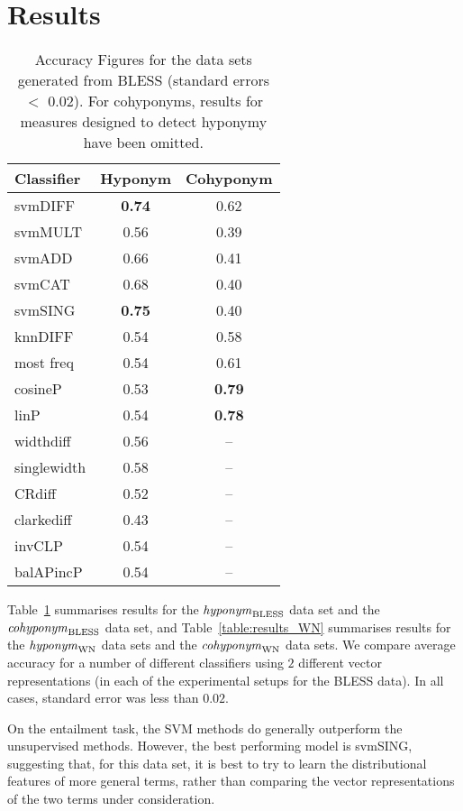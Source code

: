 \documentclass[11pt]{article}
\newcommand\entBLESS{\mbox{\em hyponym\/}_{\mbox{\scriptsize BLESS}}}
\newcommand\coordBLESS{\mbox{\em cohyponym\/}_{\mbox{\scriptsize BLESS}}}
\newcommand\entWN{\mbox{\em hyponym\/}_{\mbox{\scriptsize WN}}}
\newcommand\coordWN{\mbox{\em cohyponym\/}_{\mbox{\scriptsize WN}}}
\begin{document}
\section{Results}
\label{sect:results}

\begin{table}[ht]
\centering
\begin{tabular}{|l|c|c|}
\hline
Classifier&Hyponym&Cohyponym\\
\hline
svmDIFF&\textbf{0.74}&0.62\\
svmMULT&0.56&0.39\\
svmADD&0.66&0.41\\
svmCAT&0.68&0.40\\
svmSING&\textbf{0.75}&0.40\\
knnDIFF&0.54&0.58\\
\hline
most freq&0.54&0.61\\
cosineP&0.53&\textbf{0.79}\\
linP&0.54&\textbf{0.78}\\
widthdiff&0.56&--\\
singlewidth&0.58&--\\
CRdiff&0.52&--\\
clarkediff&0.43&--\\
invCLP&0.54&--\\
balAPincP&0.54&--\\
\hline
\end{tabular}
\caption{Accuracy Figures for the data sets generated from BLESS
  (standard errors $<$ 0.02). For cohyponyms, results for measures
  designed to detect hyponymy have been omitted.}
\label{table:results_ent}
\end{table}


Table~\ref{table:results_ent} summarises results for the $\entBLESS$ data set and the $\coordBLESS$ data set, and Table~\ref{table:results_WN} summarises results for the $\entWN$ data sets and the $\coordWN$ data sets.  We compare average accuracy for a number of different classifiers using $2$ different vector representations (in each of the experimental setups for the BLESS data).  In all cases, standard error was less than $0.02$.

On the entailment task, the SVM methods do generally outperform the unsupervised methods.  However, the best performing model is svmSING, suggesting that, for this data set, it is best to try to learn the distributional features of more general terms, rather than comparing the vector representations of the two terms under consideration.   
\end{document}
